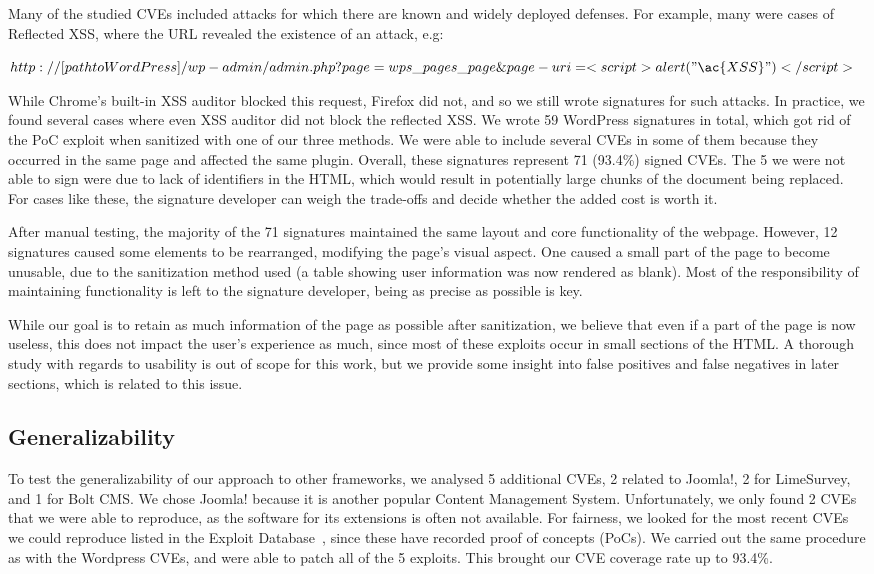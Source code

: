 Many of the studied CVEs included attacks for which there are known and widely deployed defenses. For example, many were cases of Reflected \ac{XSS}, where the URL revealed the existence of an attack, e.g:


$http://[path to WordPress]/wp-admin/admin.php?page=wps\_pages\_page\&page-uri=<script>alert("\ac{XSS}")</script>$

While Chrome's built-in \ac{XSS} auditor blocked this request, Firefox did not, and so we still wrote signatures for such attacks. In practice, we found several cases where even XSS auditor did not block the reflected XSS. We wrote 59 WordPress signatures in total, which got rid of the PoC exploit when sanitized with one of our three methods. We were able to include several CVEs in some of them because they occurred in the same page and affected the same plugin. Overall, these signatures represent 71 (93.4\%) signed CVEs. The 5 we were not able to sign were due to lack of identifiers in the HTML, which would result in potentially large chunks of the document being replaced. For cases like these, the signature developer can weigh the trade-offs and decide whether the added cost is worth it.

After manual testing, the majority of the 71 signatures maintained the same layout and core functionality of the webpage. However, 12 signatures caused some elements to be rearranged, modifying the page's visual aspect. One caused a small part of the page to become unusable, due to the sanitization method used (a table showing user information was now rendered as blank). Most of the responsibility of maintaining functionality is left to the signature developer, being as precise as possible is key.

While our goal is to retain as much information of the page as possible after sanitization, we believe that even if a part of the page is now useless, this does not impact the user's experience as much, since most of these exploits occur in small sections of the HTML. A thorough study with regards to usability is out of scope for this work, but we provide some insight into false positives and false negatives in later sections, which is related to this issue.

\subsection{Generalizability} \label{generalizability}

To test the generalizability of our approach to other frameworks, we
analysed 5 additional CVEs, 2 related to Joomla!, 2 for LimeSurvey,
and 1 for Bolt CMS.  We chose Joomla! because it is another 
popular Content Management System. Unfortunately, we only found 2 CVEs
that we were able to reproduce, as the software for its extensions is
often not available. For fairness, we looked for the most recent CVEs
we could reproduce listed in the Exploit Database~\cite{exploitdb}, since
these have recorded proof of concepts (PoCs). We carried out the same
procedure as with the Wordpress CVEs, and were able to patch all of
the 5 exploits. This brought our CVE coverage rate up to 93.4\%.



